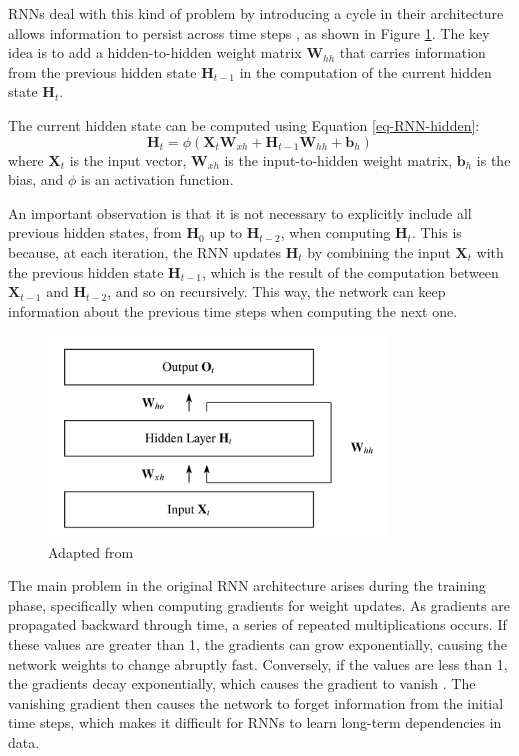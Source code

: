 RNNs deal with this kind of problem by introducing a cycle in their architecture  allows information to persist across time steps \cite{schmidt2019recurrentneuralnetworksrnns}, as shown in Figure \ref{fig:RNN-struct}. The key idea is to add a hidden-to-hidden weight matrix $\boldsymbol{W}_{hh}$ that carries information from the previous hidden state $\boldsymbol{H}_{t-1}$ in the computation of the current hidden state $\boldsymbol{H}_t$. 

The current hidden state can be computed using Equation \ref{eq-RNN-hidden}:
\begin{equation}
    \boldsymbol{H}_t = \phi(\boldsymbol{X}_t \boldsymbol{W}_{xh} + \boldsymbol{H}_{t-1} \boldsymbol{W}_{hh} + \boldsymbol{b}_h)
    \label{eq-RNN-hidden}
\end{equation}
where $\boldsymbol{X}_t$ is the input vector, $\boldsymbol{W}_{xh}$ is the input-to-hidden weight matrix, $\boldsymbol{b}_h$ is the bias, and $\phi$ is an activation function. 

An important observation is that it is not necessary to explicitly include all previous hidden states, from $\boldsymbol{H}_{0}$ up to $\boldsymbol{H}_{t-2}$, when computing $\boldsymbol{H}_t$. This is because, at each iteration, the RNN updates $\boldsymbol{H}_{t}$ by combining the input $\boldsymbol{X}_t$ with the previous hidden state $\boldsymbol{H}_{t-1}$, which is the result of the computation between $\boldsymbol{X}_{t-1}$ and $\boldsymbol{H}_{t-2}$, and so on recursively. This way, the network can keep information about the previous time steps when computing the next one.

\begin{figure}[H]
    \centering
    \includegraphics[width=9cm]{Cap2_LitReview/model_basics/RNN/rnn.png}
    \caption{Adapted from \cite{schmidt2019recurrentneuralnetworksrnns}}
    \label{fig:RNN-struct}
\end{figure}

The main problem in the original RNN architecture arises during the training phase, specifically when computing gradients for weight updates. As gradients are propagated backward through time, a series of repeated multiplications occurs. If these values are greater than 1, the gradients can grow exponentially, causing the network weights to change abruptly fast. Conversely, if the values are less than 1, the gradients decay exponentially, which causes the gradient to vanish \cite{kolen,pmlr-v9-glorot10a}. The vanishing gradient then causes the network to forget information from the initial time steps, which makes it difficult for RNNs to learn long-term dependencies in data.

